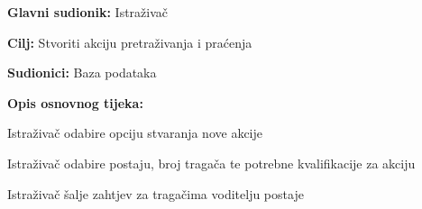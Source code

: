 					\noindent {}
					\begin{packed_item}
						
						\item \textbf{Glavni sudionik: }Istraživač
						\item  \textbf{Cilj:} Stvoriti akciju pretraživanja i praćenja
						\item  \textbf{Sudionici:} Baza podataka
						\item  \textbf{Opis osnovnog tijeka:}
						
						\item[] \begin{packed_enum}
							
							\item Istraživač odabire opciju stvaranja nove akcije
							\item Istraživač odabire postaju, broj tragača te potrebne kvalifikacije za akciju 
							\item Istraživač šalje zahtjev za tragačima voditelju postaje
							
							
						\end{packed_enum}
							
						
					\end{packed_item}
					
